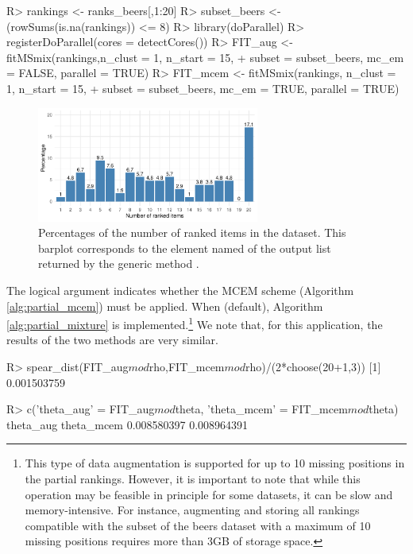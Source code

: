 \begin{example}
R> rankings <- ranks_beers[,1:20]
R> subset_beers <- (rowSums(is.na(rankings)) <= 8)
R> library(doParallel)
R> registerDoParallel(cores = detectCores())
R> FIT_aug <- fitMSmix(rankings,n_clust = 1, n_start = 15,
+                     subset = subset_beers, mc_em = FALSE, parallel = TRUE)
R> FIT_mcem <- fitMSmix(rankings, n_clust = 1, n_start = 15,
+                      subset = subset_beers, mc_em = TRUE, parallel = TRUE)
\end{example}
%
\begin{figure}[t]
     \centering
     \includegraphics[width=0.65\textwidth]{figures/RJ2025_paper_descr_beers.pdf}
      \caption{Percentages of the number of ranked items in the  dataset. This barplot corresponds to the element named  of the output list returned by the generic method .}
     \label{fig:descr_beers}
\end{figure}
The logical  argument indicates whether the MCEM scheme (Algorithm \ref{alg:partial_mcem}) must be applied. When  (default),  Algorithm \ref{alg:partial_mixture} is implemented.\footnote{
This type of data augmentation is supported for up to 10 missing positions in the partial rankings. However, it is important to note that while this operation may be feasible in principle for some datasets, it can be slow and memory-intensive. For instance, augmenting and storing all rankings compatible with the subset of the beers dataset with a maximum of 10 missing positions requires more than 3GB of storage space.}
We note that, for this application, the results of the two methods are very similar.

\begin{example}
R> spear_dist(FIT_aug$mod$rho,FIT_mcem$mod$rho)/(2*choose(20+1,3))
[1] 0.001503759

R> c('theta_aug' = FIT_aug$mod$theta, 'theta_mcem' = FIT_mcem$mod$theta)
  theta_aug  theta_mcem
0.008580397 0.008964391
\end{example}

